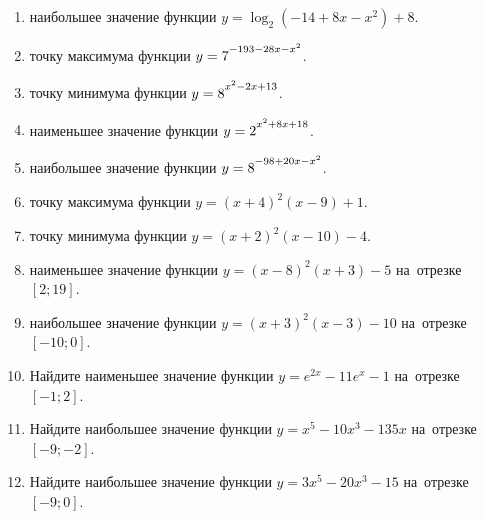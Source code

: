 \documentclass[a4paper,10pt]{article}
\begin{document}
\begin{enumerate}
\item {} наибольшее значение функции $y=\log_2\left(-14+8x-x^2\right)+8$.

\item {} точку максимума функции $y=7\strut^{-193-28x-x^2}$.

\item {} точку минимума функции $y=8\strut^{x^2-2x+13}$.

\item {} наименьшее значение функции $y=2\strut^{x^2+8x+18}$.

\item {} наибольшее значение функции $y=8\strut^{-98+20x-x^2}$.

\item {} точку максимума функции $y=\left(x+4\right)^2\left(x-9\right)+1$.

\item {} точку минимума функции $y=\left(x+2\right)^2\left(x-10\right)-4$.

\item {} наименьшее значение функции $y=\left(x-8\right)^2\left(x+3\right)-5$ на~отрезке~$\left[2;19\right]$.

\item {} наибольшее значение функции $y=\left(x+3\right)^2\left(x-3\right)-10$ на~отрезке~$\left[-10;0\right]$.

\item Найдите наименьшее значение функции $y=e^{2x}-11e^x-1$ на~отрезке~$\left[-1;2\right]$.

\item Найдите наибольшее значение функции $y=x^5-10x^3-135x$ на~отрезке~$\left[-9;-2\right]$.

\item Найдите наибольшее значение функции $y=3x^5-20x^3-15$ на~отрезке~$\left[-9;0\right]$.

\end{enumerate}
\end{document}
